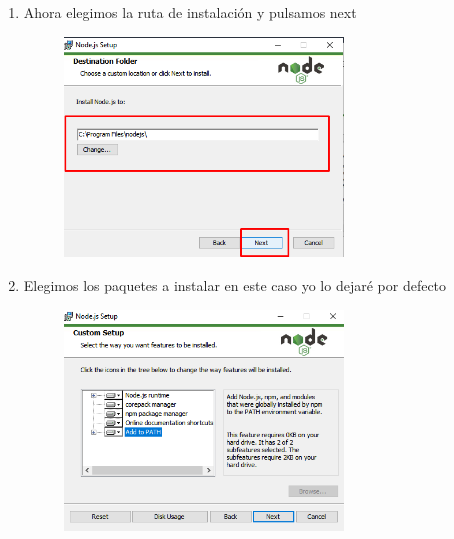 \begin{enumerate}
    
    \item Ahora elegimos la ruta de instalación y pulsamos next
    \begin{figure}[H]
        \centering
        \includegraphics[width=0.7\textwidth]{img/node4.png}
    \end{figure}
    \newpage
    \item Elegimos los paquetes a instalar en este caso yo lo dejaré por defecto
    \begin{figure}[H]
        \centering
        \includegraphics[width=0.7\textwidth]{img/NODE5.png}
    \end{figure}
    

\end{enumerate}
